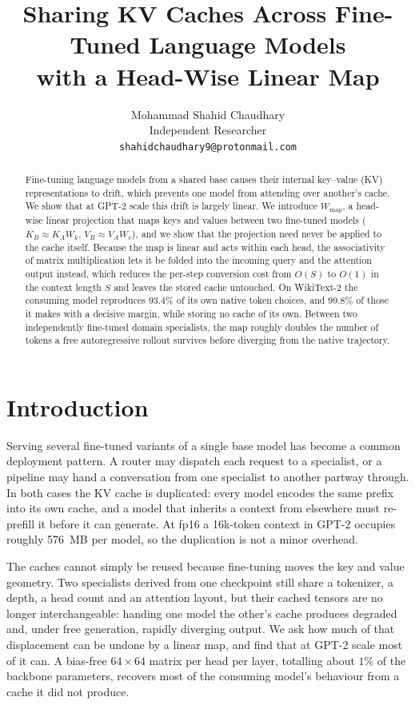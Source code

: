 \documentclass[11pt]{article}
\title{Sharing KV Caches Across Fine-Tuned Language Models\\with a Head-Wise Linear Map}
\author{%
  Mohammad Shahid Chaudhary\\
  Independent Researcher\\
  \texttt{shahidchaudhary9@protonmail.com}
}
\date{}
\begin{document}
\maketitle

\begin{abstract}
Fine-tuning language models from a shared base causes their internal key--value (KV)
representations to drift, which prevents one model from attending over another's cache.
We show that at GPT-2 scale this drift is largely linear. We introduce $W_{\mathrm{map}}$,
a head-wise linear projection that maps keys and values between two fine-tuned models
($K_B \approx K_A W_k$, $V_B \approx V_A W_v$), and we show that the projection need never
be applied to the cache itself. Because the map is linear and acts within each head,
the associativity of matrix multiplication lets it be folded into the incoming query and
the attention output instead, which reduces the per-step conversion cost from $O(S)$ to
$O(1)$ in the context length $S$ and leaves the stored cache untouched. On WikiText-2 the
consuming model reproduces $93.4\%$ of its own native token choices, and $99.8\%$ of those
it makes with a decisive margin, while storing no cache of its own. Between two independently
fine-tuned domain specialists, the map roughly doubles the number of tokens a free
autoregressive rollout survives before diverging from the native trajectory.
\end{abstract}

\section{Introduction}

Serving several fine-tuned variants of a single base model has become a common deployment
pattern. A router may dispatch each request to a specialist, or a pipeline may hand a
conversation from one specialist to another partway through. In both cases the KV cache is
duplicated: every model encodes the same prefix into its own cache, and a model that
inherits a context from elsewhere must re-prefill it before it can generate. At fp16 a
16k-token context in GPT-2 occupies roughly 576~MB per model, so the duplication is not a
minor overhead.

The caches cannot simply be reused because fine-tuning moves the key and value geometry.
Two specialists derived from one checkpoint still share a tokenizer, a depth, a head count
and an attention layout, but their cached tensors are no longer interchangeable: handing
one model the other's cache produces degraded and, under free generation, rapidly diverging
output. We ask how much of that displacement can be undone by a linear map, and find that
at GPT-2 scale most of it can. A bias-free $64 \times 64$ matrix per head per layer,
totalling about $1\%$ of the backbone parameters, recovers most of the consuming model's
behaviour from a cache it did not produce.
\end{document}

